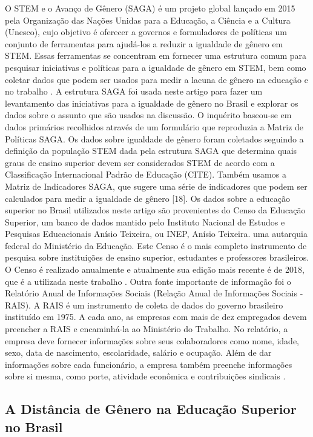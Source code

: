 O STEM e o Avanço de Gênero (SAGA) é um projeto global lançado em 2015 pela Organização das Nações Unidas para a Educação, a Ciência e a Cultura (Unesco), cujo objetivo é oferecer a governos e formuladores de políticas um conjunto de ferramentas para ajudá-los a reduzir a igualdade de gênero em STEM. Essas ferramentas se concentram em fornecer uma estrutura comum para pesquisar iniciativas e políticas para a igualdade de gênero em STEM, bem como coletar dados que podem ser usados para medir a lacuna de gênero na educação e no trabalho \citep{noauthor_saga_nodate}. A estrutura SAGA foi usada neste artigo para fazer um levantamento das iniciativas para a igualdade de gênero no Brasil e explorar os dados sobre o assunto que são usados ​​na discussão. O inquérito baseou-se em dados primários recolhidos através de um formulário que reproduzia a Matriz de Políticas SAGA. Os dados sobre igualdade de gênero foram coletados seguindo a definição da população STEM dada pela estrutura SAGA que determina quais graus de ensino superior devem ser considerados STEM de acordo com a Classificação Internacional Padrão de Educação (CITE). Também usamos a Matriz de Indicadores SAGA, que sugere uma série de indicadores que podem ser calculados para medir a igualdade de gênero [18]. Os dados sobre a educação superior no Brasil utilizados neste artigo são provenientes do Censo da Educação Superior, um banco de dados mantido pelo Instituto Nacional de Estudos e Pesquisas Educacionais Anísio Teixeira, ou INEP, Anísio Teixeira. uma autarquia federal do Ministério da Educação. Este Censo é o mais completo instrumento de pesquisa sobre instituições de ensino superior, estudantes e professores brasileiros. O Censo é realizado anualmente e atualmente sua edição mais recente é de 2018, que é a utilizada neste trabalho \citep{noauthor_censo_nodate}. Outra fonte importante de informação foi o Relatório Anual de Informações Sociais (Relação Anual de Informações Sociais - RAIS). A RAIS é um instrumento de coleta de dados do governo brasileiro instituído em 1975. A cada ano, as empresas com mais de dez empregados devem preencher a RAIS e encaminhá-la ao Ministério do Trabalho. No relatório, a empresa deve fornecer informações sobre seus colaboradores como nome, idade, sexo, data de nascimento, escolaridade, salário e ocupação. Além de dar informações sobre cada funcionário, a empresa também preenche informações sobre si mesma, como porte, atividade econômica e contribuições sindicais \citep{noauthor_rais_nodate}.

\subsection{A Distância de Gênero na Educação Superior no Brasil}

